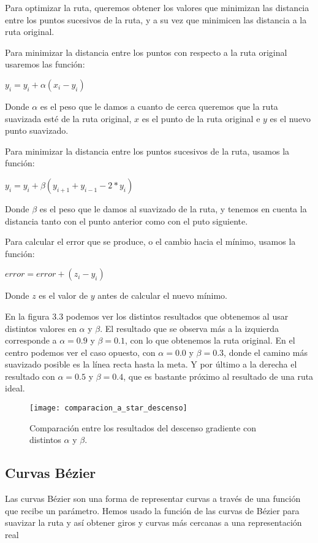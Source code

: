 Para optimizar la ruta, queremos obtener los valores que minimizan las distancia entre los puntos sucesivos de la ruta, y a su vez que minimicen las distancia a la ruta original.

Para minimizar la distancia entre los puntos con respecto a la ruta original usaremos las función:
\begin{center}
$y_i = y_i + \alpha (x_i - y_i)$
\end{center}
Donde $\alpha$ es el peso que le damos a cuanto de cerca queremos que la ruta suavizada esté de la ruta original, $x$ es el punto de la ruta original e $y$ es el nuevo punto suavizado.

Para minimizar la distancia entre los puntos sucesivos de la ruta, usamos la función:
\begin{center}
$y_i = y_i + \beta (y_{i+1} + y_{i-1} - 2 * y_i)$
\end{center}
Donde $\beta$ es el peso que le damos al suavizado de la ruta, y tenemos en cuenta la distancia tanto con el punto anterior como con el puto siguiente.

Para calcular el error que se produce, o el cambio hacia el mínimo, usamos la función:
\begin{center}
$error = error + (z_i - y_i)$
\end{center}
Donde $z$ es el valor de $y$ antes de calcular el nuevo mínimo.

En la figura 3.3 podemos ver los distintos resultados que obtenemos al usar distintos valores en $\alpha$ y $\beta$. El resultado que se observa más a la izquierda corresponde a $\alpha = 0.9$ y $\beta = 0.1$, con lo que obtenemos la ruta original. En el centro podemos ver el caso opuesto, con $\alpha = 0.0$ y $\beta = 0.3$, donde el camino más suavizado posible es la línea recta hasta la meta. Y por último a la derecha el resultado con $\alpha = 0.5$ y $\beta = 0.4$, que es bastante próximo al resultado de una ruta ideal.
\begin{figure}[!htpb]
    \centering
    \texttt{[image: comparacion\_a\_star\_descenso]}
    \caption[Efecto de $\alpha$ y $\beta$ en el descenso gradiente]{Comparación entre los resultados del descenso gradiente con distintos $\alpha$ y $\beta$.}
    \label{fig:basics AFM sketch}
\end{figure}

\subsection{Curvas Bézier}
Las curvas Bézier \cite{bezierdevmag, wiki:bezier} son una forma de representar curvas a través de una función que recibe un parámetro. Hemos usado la función de las curvas de Bézier para suavizar la ruta y así obtener giros y curvas más cercanas a una representación real

